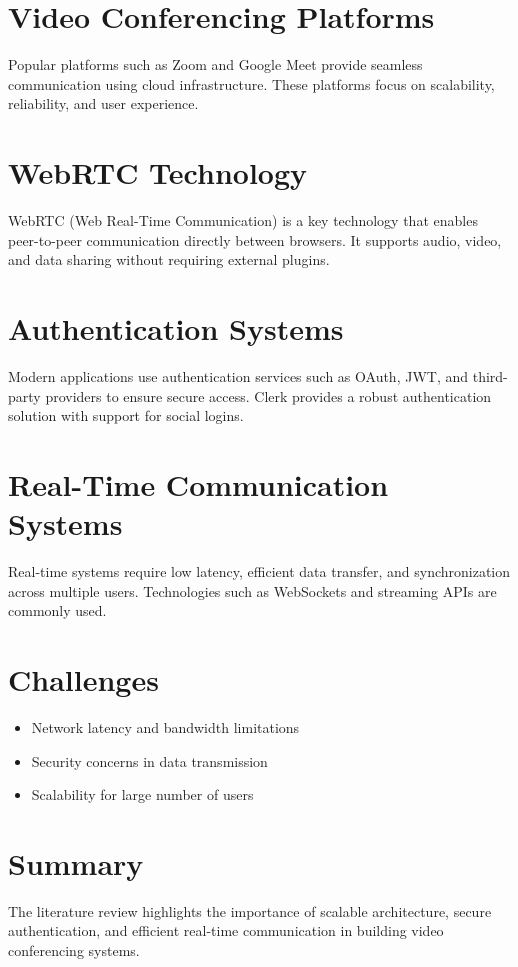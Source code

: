 \section{Video Conferencing Platforms}

Popular platforms such as Zoom and Google Meet provide seamless communication using cloud infrastructure. These platforms focus on scalability, reliability, and user experience.

\section{WebRTC Technology}

WebRTC (Web Real-Time Communication) is a key technology that enables peer-to-peer communication directly between browsers. It supports audio, video, and data sharing without requiring external plugins.

\section{Authentication Systems}

Modern applications use authentication services such as OAuth, JWT, and third-party providers to ensure secure access. Clerk provides a robust authentication solution with support for social logins.

\section{Real-Time Communication Systems}

Real-time systems require low latency, efficient data transfer, and synchronization across multiple users. Technologies such as WebSockets and streaming APIs are commonly used.

\section{Challenges}

\begin{itemize}
\item Network latency and bandwidth limitations
\item Security concerns in data transmission
\item Scalability for large number of users
\end{itemize}

\section{Summary}

The literature review highlights the importance of scalable architecture, secure authentication, and efficient real-time communication in building video conferencing systems.